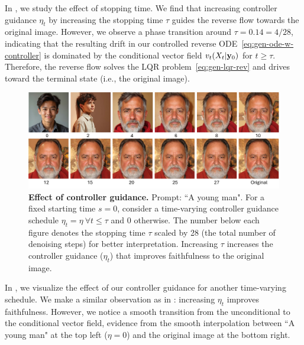 \documentclass{article} %
\theoremstyle{plain}
\begin{document}
In , we study the effect of stopping time.
We find that increasing controller guidance $\eta_t$ by increasing the stopping time $\tau$ guides the reverse flow towards the original image. 
However, we observe a phase transition around $\tau = 0.14 = 4/28 $, indicating that the resulting drift in our controlled reverse ODE~\eqref{eq:gen-ode-w-controller} is dominated by the conditional vector field $v_t(X_t|{\mathbf{y}}_0)$ for $t\geq \tau$.
Therefore, the reverse flow solves the LQR problem~\eqref{eq:gen-lqr-rev} and drives toward the terminal state (i.e., the original image).



\begin{figure}[!tbh]
\includegraphics[width=\linewidth]{pics/ablation-stop-time-fixed-eta_low.pdf}
\caption{
\textbf{Effect of controller guidance.}
Prompt: ``A young man". 
For a fixed starting time $s=0$, consider a time-varying controller guidance schedule $\eta_t = \eta ~\forall t \leq \tau$ and $0$ otherwise. 
The number below each figure denotes the stopping time $\tau$ scaled by 28 (the total number of denoising steps) for better interpretation.
Increasing $\tau$ increases the controller guidance ($\eta_t$) that improves faithfulness to the original image.
}
\label{fig:abl-stop-time}
\end{figure}



In , we visualize the effect of our controller guidance for another time-varying schedule.
We make a similar observation as in : increasing $\eta_t$ improves faithfulness. 
However, we notice a smooth transition from the unconditional to the conditional vector field, evidence from the smooth interpolation between ``A young man" at the top left ($\eta=0$) and the original image at the bottom right.
\end{document}
